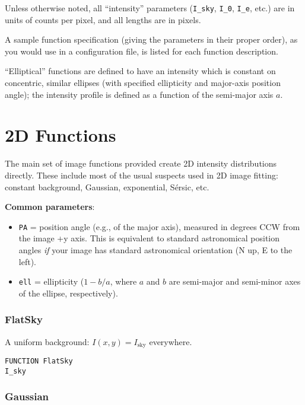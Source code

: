 \documentclass[10pt,a4paper,article]{memoir}
\begin{document}
Unless otherwise noted, all ``intensity'' parameters (\texttt{I\_sky},
\texttt{I\_0}, \texttt{I\_e}, etc.) are in units of counts per pixel, and all
lengths are in pixels.

A sample function specification (giving the parameters in their proper order),
as you would use in a configuration file, is listed for each function
description.

``Elliptical'' functions are defined to have an intensity which is constant on
concentric, similar ellipses (with specified ellipticity and major-axis position angle);
the intensity profile is defined as a function of the semi-major axis $a$.


\section{2D Functions}

The main set of image functions provided create 2D intensity distributions
directly. These include most of the usual suspects used in 2D image fitting:
constant background, Gaussian, exponential, S{\'e}rsic, etc.

\medskip

\textbf{Common parameters}: 
\begin{itemize}
\item \texttt{PA} = position angle (e.g., of the major axis), measured in degrees CCW from
the image +y axis. This is equivalent to standard astronomical position angles \textit{if}
your image has standard astronomical orientation (N up, E to the left).
\item \texttt{ell} = ellipticity ($1 - b/a$, where $a$ and $b$ are semi-major and semi-minor
axes of the ellipse, respectively).
\end{itemize}


\subsubsection{FlatSky}

A uniform background: $I(x,y) = I_{\mathrm{sky}}$ everywhere.

\begin{verbatim}
FUNCTION FlatSky
I_sky
\end{verbatim}


\subsubsection{Gaussian}
\end{document}
